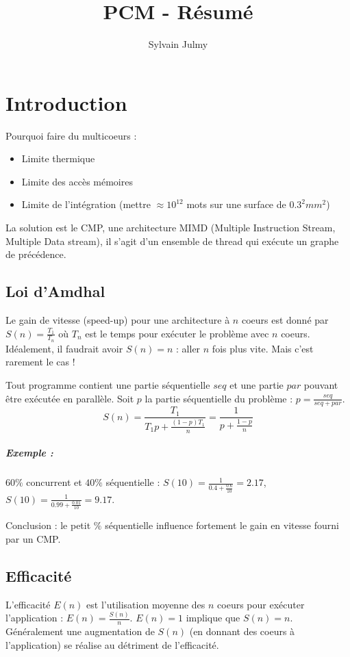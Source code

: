 \documentclass[11pt,a4paper]{report}
\author{Sylvain Julmy}
\title{PCM - Résumé}
\begin{document}
\chapter{Introduction} %
\label{cha:Introduction}

Pourquoi faire du multicoeurs :
\begin{itemize}
    \item Limite thermique
    \item Limite des accès mémoires
    \item Limite de l'intégration (mettre $\approx 10^{12}$ mots sur une surface de $0.3^2mm^2$)
\end{itemize}

La solution est le CMP, une architecture MIMD (Multiple Instruction Stream, Multiple Data stream),
il s'agit d'un ensemble de thread qui exécute un graphe de précédence.

\section{Loi d'Amdhal} %
\label{sec:Loi d'Amdhal}
Le gain de vitesse (speed-up) pour une architecture à $n$ coeurs est donné par
$S(n)=\frac{T_1}{T_n}$ où $T_n$ est le temps pour exécuter le problème avec $n$ coeurs. Idéalement,
il faudrait avoir $S(n)=n$ : aller $n$ fois plus vite. Mais c'est rarement le cas !

Tout programme contient une partie séquentielle $seq$ et une partie $par$ pouvant être exécutée en
parallèle. Soit $p$ la partie séquentielle du problème : $p=\frac{seq}{seq+par}$.
$$
S(n) = \frac{T_1}{T_1p+\frac{(1-p)T_1}{n}} = \frac{1}{p+\frac{1-p}{n}}
$$

\paragraph*{Exemple : } $60\%$ concurrent et $40\%$ séquentielle : $S(10) =
\frac{1}{0.4+\frac{0.6}{10}} = 2.17$, $S(10) = \frac{1}{0.99+\frac{0.01}{10}} = 9.17$.

Conclusion : le petit $\%$ séquentielle influence fortement le gain en vitesse fourni par un CMP.

\section{Efficacité} %
\label{sec:Efficacité}

L'efficacité $E(n)$ est l'utilisation moyenne des $n$ coeurs pour exécuter l'application :
$E(n)=\frac{S(n)}{n}$. $E(n) = 1$ implique que $S(n) = n$. Généralement une augmentation de $S(n)$
(en donnant des coeurs à l'application) se réalise au détriment de l'efficacité.
\end{document}
